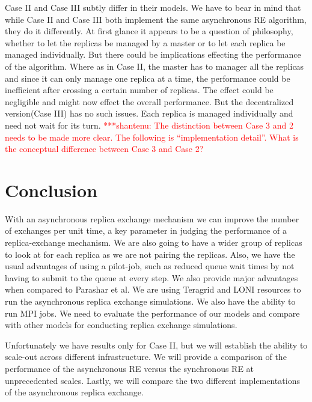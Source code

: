 \documentclass[a4paper,10pt]{article}
\newcommand{\jhanote}[1]{ {\textcolor{red} { ***shantenu: #1 }}}
\newcommand{\athotanote}[1]{ {\textcolor{green} { ***athota: #1 }}}
\newcommand{\jhanote}[1]{}
\newcommand{\athotanote}[1]{}
\begin{document}
Case II and Case III subtly differ in their models. We have to bear in mind that while Case II and Case III both implement the same asynchronous RE algorithm, they do it differently. At first glance it appears to be a question of philosophy, whether to let the replicas be managed by a master or to let each replica be managed individually. But there could be implications effecting the performance of the algorithm. Where as in Case II, the master has to manager all the replicas and since it can only manage one replica at a time, the performance could be inefficient after crossing a certain number of replicas. The effect could be negligible and might now effect the overall performance. But the decentralized version(Case III) has no such issues. Each replica is managed individually and need not wait for its turn.
\jhanote{The distinction between
  Case 3 and 2 needs to be made more clear. The following is
  ``implementation detail''. What is the conceptual difference between
  Case 3 and Case 2?} 

\section{Conclusion}
With an asynchronous replica exchange mechanism we can improve the number of exchanges per unit time, 
a key parameter in judging the performance of a replica-exchange mechanism. %
We are also going to have a wider group of replicas to look at for each replica as we are not pairing 
the replicas. Also, we have the usual advantages of using a pilot-job, such as reduced queue wait 
times by not having to submit to the queue at every step. 
We also provide major advantages when compared to Parashar et al. We are using Teragrid and LONI resources to run the asynchronous replica exchange simulations. We also have the ability to run MPI jobs. We need to evaluate the performance of our models and compare with other models for conducting replica exchange simulations. 

Unfortunately we have results only for Case II, but we will establish the ability to scale-out across different infrastructure. We will provide a comparison of the performance of the asynchronous RE versus the synchronous RE at unprecedented scales. Lastly, we will compare the two different implementations of the asynchronous replica exchange.


 
  
 
\end{document}
